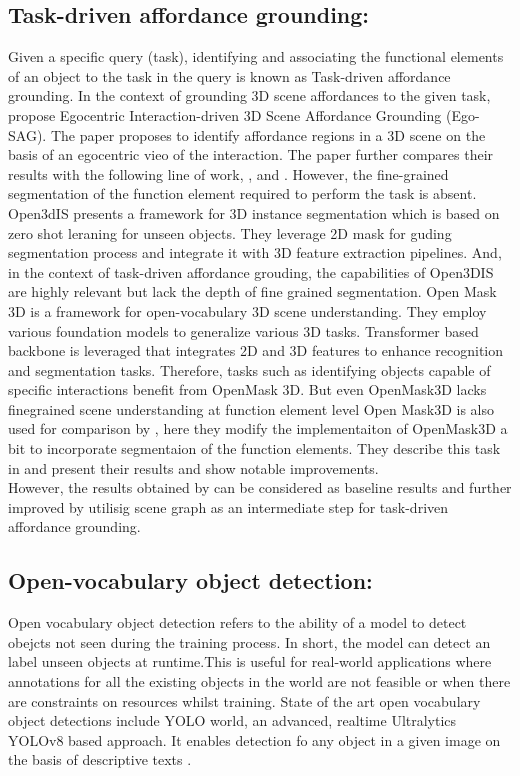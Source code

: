  \subsection{Task-driven affordance grounding:}
Given a specific query (task), identifying and associating the functional elements of an object to the task in the query is known as Task-driven affordance grounding. 
In the context of grounding 3D scene affordances to the given task, \citet{liu2024grounding3dsceneaffordance} propose
 Egocentric Interaction-driven 3D Scene Affordance Grounding (Ego-SAG). The paper proposes to identify affordance regions in a 3D scene on the basis of 
 an egocentric vieo of the interaction. The paper further compares their results with the following line of work,
\cite{huang2024openins3dsnaplookup3d}, \cite{Nguyen_2024_CVPR} and \cite{takmaz2023openmask3dopenvocabulary3dinstance}. However, the fine-grained 
segmentation of the function element required to perform the task is absent. Open3dIS presents a framework for 3D instance segmentation which is based on
zero shot leraning for unseen objects. They leverage 2D mask for guding segmentation process and integrate it with 3D feature extraction pipelines. And, in the context
of task-driven affordance grouding, the capabilities of Open3DIS are highly relevant but lack the depth of fine grained segmentation. Open Mask 3D is a framework
 for open-vocabulary 3D scene understanding. They employ
various foundation models to generalize various 3D tasks. Transformer based backbone is leveraged that integrates 2D and 3D features to enhance 
recognition and segmentation tasks. Therefore, tasks such as identifying objects capable of specific interactions benefit from OpenMask 3D. 
But even OpenMask3D lacks finegrained scene understanding at function element level
Open Mask3D \cite{takmaz2023openmask3dopenvocabulary3dinstance} is also used for comparison by
\citet{delitzas2024scenefun3d}, here they modify the implementaiton of OpenMask3D a bit to incorporate segmentaion of the function elements. 
They describe this task in \cite{delitzas2024scenefun3d} and present their results and show notable improvements.\\
However, the results obtained by \citet{delitzas2024scenefun3d}
can be considered as baseline results and further improved by utilisig scene graph as an intermediate step for task-driven affordance grounding.

 \subsection{Open-vocabulary object detection:}
Open vocabulary object detection refers to the ability of a model to detect obejcts not seen during the training process. 
In short, the model can detect an label unseen objects at runtime.This is useful for real-world applications where annotations for all the 
existing objects in the world are not feasible or when there are constraints on resources whilst training. State of the art open vocabulary object detections include
YOLO world, an advanced, realtime Ultralytics YOLOv8 based approach. It enables detection fo any object in a given image on the basis of descriptive texts \cite{cheng2024yolow}. \\

